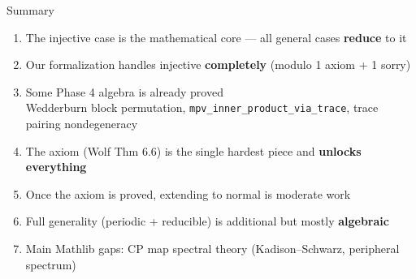 \documentclass[aspectratio=169,10pt]{beamer}
\begin{document}
\begin{frame}{Summary}
    \vspace{-0.3em}

    \begin{enumerate}\itemsep0.3em\small
        \item The \textcolor{amber}{injective case} is the mathematical core ---
              all general cases \textbf{reduce} to it
        \item Our formalization handles injective \textbf{completely}
              (modulo 1 axiom + 1 sorry)
        \item Some Phase 4 algebra is already proved\\
              {\tiny Wedderburn block permutation, \texttt{mpv\_inner\_product\_via\_trace}, trace pairing nondegeneracy}
        \item The \textcolor{softred}{axiom} (Wolf Thm 6.6) is the single
              hardest piece and \textbf{unlocks everything}
        \item Once the axiom is proved, extending to
              \textcolor{leangreen}{normal} is moderate work
        \item Full generality (\textcolor{leanblue}{periodic} +
              \textcolor{softred}{reducible}) is additional but mostly
              \textbf{algebraic}
        \item Main Mathlib gaps: CP map spectral theory
              (Kadison--Schwarz, peripheral spectrum)
    \end{enumerate}

    \vspace{0.5em}
    \begin{center}
\end{center}
\end{frame}
\end{document}
